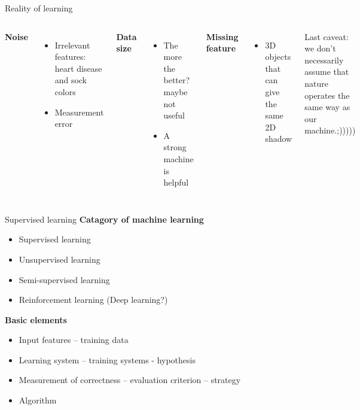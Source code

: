 \documentclass{beamer}
\begin{document}
\begin{frame}{Reality of learning}
\begin{columns}
\textbf{Noise}
\begin{itemize}
\item Irrelevant features: heart disease and sock colors
\item Measurement error
\end{itemize}
\vspace{3pt}
\textbf{Data size}
\begin{itemize}
\item The more the better? maybe not useful
\item A strong machine is helpful
\end{itemize}
\vspace{3pt}
\textbf{Missing feature}
\begin{itemize}
\item 3D objects that can give the same 2D shadow
\end{itemize}
\vspace{3pt}
Last caveat: we don't necessarily assume that nature operates the same way as our machine.;)))))
\begin{figure}
\centering
\includegraphics[width=3.2cm]{ep11.jpeg}
\end{figure}
\end{columns}
\end{frame}

\begin{frame}{Supervised learning}
\textbf{Catagory of machine learning}
\begin{itemize}
\item Supervised learning
\item Unsupervised learning
\item Semi-supervised learning
\item Reinforcement learning (Deep learning?)
\end{itemize}
\vspace{6pt}
\textbf{Basic elements}
\begin{itemize}
\item Input features -- training data
\item Learning system -- training systems - hypothesis 
\item Measurement of correctness -- evaluation criterion -- strategy
\item Algorithm
\end{itemize}
\end{frame}
\end{document}
